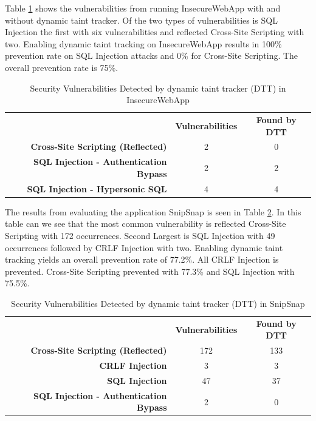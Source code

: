 Table \ref{table:InsecureTable} shows the vulnerabilities from running InsecureWebApp \parencite{insecure} with and without dynamic taint tracker. Of the two types of vulnerabilities is SQL Injection the first with six vulnerabilities and reflected Cross-Site Scripting with two. Enabling dynamic taint tracking on InsecureWebApp \parencite{insecure} results in 100\% prevention rate on SQL Injection attacks and 0\% for Cross-Site Scripting. The overall prevention rate is 75\%. 

\begin{table}[H]
  \centering
  \caption{Security Vulnerabilities Detected by dynamic taint tracker (DTT) in InsecureWebApp}
  \label{table:InsecureTable}
    \begin{tabular}{rcc}
      & \textbf{Vulnerabilities} & \textbf{Found by DTT} \\
      \textbf{Cross-Site Scripting (Reflected)}      & 2             & 0  \\
      \textbf{SQL Injection - Authentication Bypass} & 2             & 2  \\
      \textbf{SQL Injection - Hypersonic SQL}        & 4             & 4  
    \end{tabular}
\end{table}

The results from evaluating the application SnipSnap \parencite{snipsnap} is seen in Table \ref{table:SnipSnapTable}. In this table can we see that the most common vulnerability is reflected Cross-Site Scripting with 172 occurrences. Second Largest is SQL Injection with 49 occurrences followed by CRLF Injection with two. Enabling dynamic taint tracking yields an overall prevention rate of 77.2\%. All CRLF Injection is prevented. Cross-Site Scripting prevented with 77.3\% and SQL Injection with 75.5\%.

\begin{table}[H]
  \centering
  \caption{Security Vulnerabilities Detected by dynamic taint tracker (DTT) in SnipSnap}
  \label{table:SnipSnapTable}
  \begin{tabular}{rcc}
    & \textbf{Vulnerabilities} & \textbf{Found by DTT} \\
    \textbf{Cross-Site Scripting (Reflected)}      & 172           & 133  \\
    \textbf{CRLF Injection}                        & 3             & 3    \\
    \textbf{SQL Injection}                         & 47            & 37   \\
    \textbf{SQL Injection - Authentication Bypass} & 2             & 0       
  \end{tabular}
\end{table}

